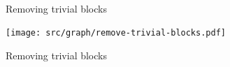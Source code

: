 \begin{figure}[htb]
    \\
    \caption{Removing trivial blocks \label{img:remove-trivial}}
\end{figure}

\begin{figure}
    \centering
    \texttt{[image: src/graph/remove-trivial-blocks.pdf]}
    \caption{Removing trivial blocks\label{img:remove}}
\end{figure}